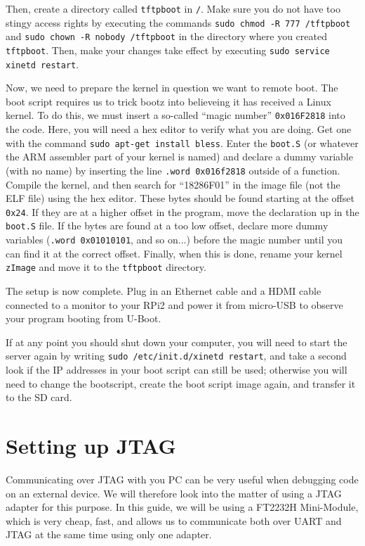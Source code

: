 \documentclass[a4paper,11pt,reqno]{amsart}
\begin{document}
Then, create a directory called \texttt{tftpboot} in \texttt{/}. Make sure you do not have too stingy access rights by executing the commands \texttt{sudo chmod -R 777 /tftpboot} and \texttt{sudo chown -R nobody /tftpboot} in the directory where you created \texttt{tftpboot}. Then, make your changes take effect by executing \texttt{sudo service xinetd restart}.

Now, we need to prepare the kernel in question we want to remote boot. The boot script requires us to trick bootz into believeing it has received a Linux kernel. To do this, we must insert a so-called ``magic number'' \texttt{0x016F2818} into the code. Here, you will need a hex editor to verify what you are doing. Get one with the command \texttt{sudo apt-get install bless}. Enter the \texttt{boot.S} (or whatever the ARM assembler part of your kernel is named) and declare a dummy variable (with no name) by inserting the line \texttt{.word 0x016f2818} outside of a function. Compile the kernel, and then search for ``18286F01'' in the image file (not the ELF file) using the hex editor. These bytes should be found starting at the offset \texttt{0x24}. If they are at a higher offset in the program, move the declaration up in the \texttt{boot.S} file. If the bytes are found at a too low offset, declare more dummy variables (\texttt{.word 0x01010101}, and so on...) before the magic number until you can find it at the correct offset. Finally, when this is done, rename your kernel \texttt{zImage} and move it to the \texttt{tftpboot} directory.

The setup is now complete. Plug in an Ethernet cable and a HDMI cable connected to a monitor to your RPi2 and power it from micro-USB to observe your program booting from U-Boot.

If at any point you should shut down your computer, you will need to start the server again by writing \texttt{sudo /etc/init.d/xinetd restart}, and take a second look if the IP addresses in your boot script can still be used; otherwise you will need to change the bootscript, create the boot script image again, and transfer it to the SD card.

\section{Setting up JTAG}
Communicating over JTAG with you PC can be very useful when debugging code on an external device. We will therefore look into the matter of using a JTAG adapter for this purpose. In this guide, we will be using a FT2232H Mini-Module, which is very cheap, fast, and allows us to communicate both over UART and JTAG at the same time using only one adapter.
\end{document}
